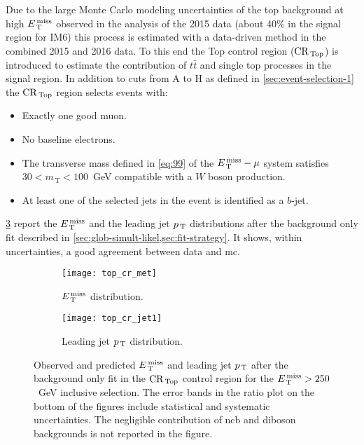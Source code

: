 Due to the large Monte Carlo modeling uncertainties of the top background at
high $E_\mathrm{\, T}^\mathrm{\, miss}$ observed in the analysis of the 2015 data (about 40\% in the signal
region for IM6) this process is estimated with a data-driven method in the
combined 2015 and 2016 data. To this end the Top control region ($\mathrm{CR}_\mathrm{\, Top}$) is
introduced to estimate the contribution of $t \bar{t}$ and single top processes
in the signal region. In addition to cuts from A to H as defined in
\cref{sec:event-selection-1} the $\mathrm{CR}_\mathrm{\, Top}$ region selects events with:
\begin{itemize}
\item Exactly one good muon.
\item No baseline electrons.
\item The transverse mass defined in \eqref{eq:99} of the $E_\mathrm{\, T}^\mathrm{\, miss} - \mu$ system
  satisfies $30 < m_\mathrm{\, T} < 100$~GeV compatible with a $W$ boson
  production.
\item At least one of the selected jets in the event is identified as a $b$-jet.
\end{itemize}
\cref{fig:top_plots} report the $E_\mathrm{\, T}^\mathrm{\, miss}$ and the leading jet $p_\mathrm{\, T}$ distributions
after the background only fit described in
\cref{sec:glob-simult-likel,sec:fit-strategy}. It shows, within uncertainties, a
good agreement between data and \gls{mc}.
\begin{figure}[!h]
  \centering
  \begin{subfigure}[t]{.48\linewidth}
    \texttt{[image: top\_cr\_met]}
    \caption{$E_\mathrm{\, T}^\mathrm{\, miss}$ distribution.}
    \label{fig:top_cr_et_miss}
  \end{subfigure}
  \begin{subfigure}[t]{.48\linewidth}
    \texttt{[image: top\_cr\_jet1]}
    \caption{Leading jet $p_\mathrm{\, T}$ distribution.}
    \label{fig:top_cr_jet1}
  \end{subfigure}
  \caption{Observed and predicted $E_\mathrm{\, T}^\mathrm{\, miss}$ and leading jet $p_\mathrm{\, T}$ after the
    background only fit in the $\mathrm{CR}_\mathrm{\, Top}$ control region for the $E_\mathrm{\, T}^\mathrm{\, miss} > 250$~GeV
    inclusive selection. The error bands in the ratio plot on the bottom of the
    figures include statistical and systematic uncertainties. The negligible
    contribution of \gls{ncb} and diboson backgrounds is not reported in the
    figure.}
  \label{fig:top_plots}
\end{figure}
